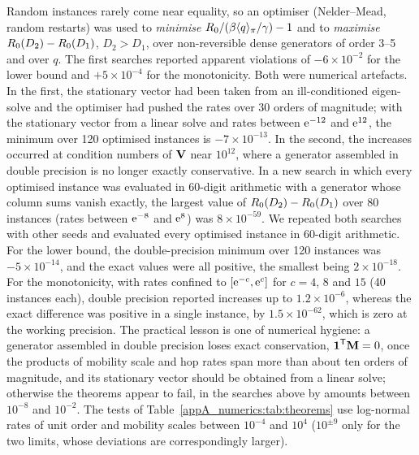Random instances rarely come near equality, so an optimiser (Nelder--Mead, random restarts) was used to
\emph{minimise} $R_0/(\beta\langle q\rangle_{\pi}/\gamma)-1$ and to \emph{maximise} $R_0(D_2)-R_0(D_1)$, $D_2>D_1$, over
non-reversible dense generators of order 3--5 and over $q$. The first searches reported apparent violations of
$-6\times10^{-2}$ for the lower bound and $+5\times10^{-4}$ for the monotonicity.
Both were numerical artefacts. In the first, the stationary vector had been taken from an ill-conditioned
eigen-solve and the optimiser had pushed the rates over 30 orders of magnitude; with the stationary vector
from a linear solve and rates between $\mathrm{e}^{-12}$ and $\mathrm{e}^{12}$, the minimum over 120 optimised instances is
$-7\times10^{-13}$.
In the second, the increases occurred at condition numbers of $\mathbf{V}$ near $10^{12}$, where a generator
assembled in double precision is no longer exactly conservative. In a new search in which every optimised
instance was evaluated in 60-digit arithmetic \citep{mpmath2023} with a generator whose column sums vanish
exactly, the largest value of $R_0(D_2)-R_0(D_1)$ over 80 instances (rates between $\mathrm{e}^{-8}$ and $\mathrm{e}^{8}$) was
$8\times10^{-59}$.
We repeated both searches with other seeds and evaluated every optimised instance in 60-digit arithmetic.
For the lower bound, the double-precision minimum over 120 instances was $-5\times10^{-14}$, and the exact
values were all positive, the smallest being $2\times10^{-18}$. For the monotonicity, with rates confined to
$[\mathrm{e}^{-c},\mathrm{e}^{c}]$ for $c=4$, $8$ and $15$ (40 instances each), double precision reported increases
up to $1.2\times10^{-6}$, whereas the exact difference was positive in a single instance, by
$1.5\times10^{-62}$, which is zero at the working precision.
The practical lesson is one of numerical hygiene: a generator assembled in double precision loses exact
conservation, $\boldsymbol{1}^{\mathsf{T}}\mathbf{M}=0$, once the products of mobility scale and hop rates span more than about ten
orders of magnitude, and its stationary vector should be obtained from a linear solve; otherwise the theorems
appear to fail, in the searches above by amounts between $10^{-8}$ and $10^{-2}$. The tests of
Table~\ref{appA_numerics:tab:theorems} use log-normal rates of unit order and mobility scales between
$10^{-4}$ and $10^{4}$ ($10^{\pm9}$ only for the two limits, whose deviations are correspondingly larger).

